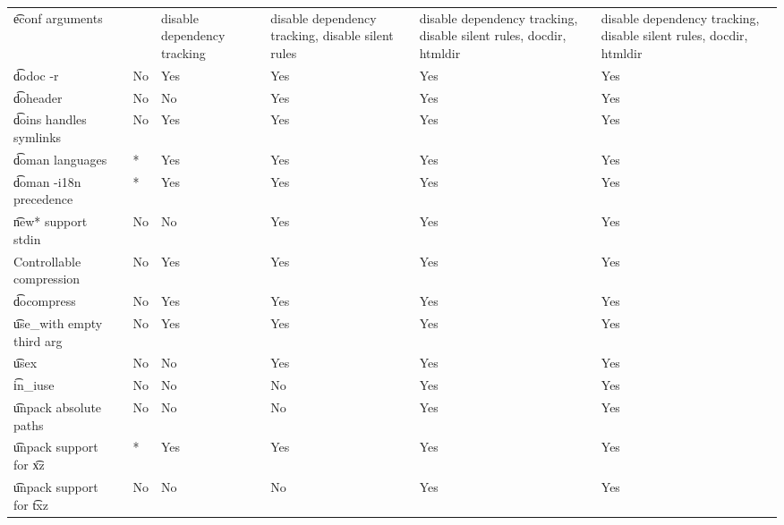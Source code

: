 \begin{landscape}
\begin{longtable}{llP{7.5em}P{7.5em}P{7.5em}P{7.5em}P{7.5em}}
\t{econf} arguments &  &
    & disable dependency tracking &
    disable dependency tracking, disable silent rules &
    disable dependency tracking, disable silent rules, docdir, htmldir &
    disable dependency tracking, disable silent rules, docdir, htmldir \\

\t{dodoc -r} &  &
    No & Yes & Yes & Yes & Yes \\

\t{doheader} &  &
    No & No & Yes & Yes & Yes \\

\t{doins} handles symlinks &  &
    No & Yes & Yes & Yes & Yes \\

\t{doman} languages &  &
    * & Yes & Yes & Yes & Yes \\

\t{doman -i18n} precedence &  &
    * & Yes & Yes & Yes & Yes \\

\t{new*} support stdin &  &
    No & No & Yes & Yes & Yes \\

Controllable compression &  &
    No & Yes & Yes & Yes & Yes \\

\t{docompress} &  &
    No & Yes & Yes & Yes & Yes \\

\t{use_with} empty third arg &  &
    No & Yes & Yes & Yes & Yes \\

\t{usex} &  &
    No & No & Yes & Yes & Yes \\

\t{in_iuse} &  &
    No & No & No & Yes & Yes \\

\t{unpack} absolute paths &  &
    No & No & No & Yes & Yes \\

\t{unpack} support for \t{xz} &  &
    * & Yes & Yes & Yes & Yes \\

\t{unpack} support for \t{txz} &  &
    No & No & No & Yes & Yes \\


\end{longtable}
\end{landscape}
